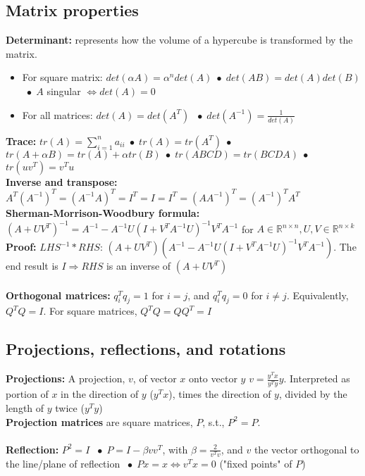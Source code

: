 \documentclass{article}
\newcommand*\bspace{$\; \bullet \;$}
\begin{document}
\subsection{Matrix properties}
\textbf{Determinant: } represents how the volume of a hypercube is transformed by the matrix.
\begin{itemize}
    \item For square matrix: $det(\alpha A) = \alpha^ndet(A)$\bspace$det(AB) = det(A)det(B)$ \bspace $A$ singular $\Leftrightarrow det(A) = 0$
    \item For all matrices: $det(A) = det(A^T)$ \bspace $det(A^{-1}) = \frac{1}{det(A)}$
\end{itemize}
\textbf{Trace:} $tr(A) = \sum_{i = 1}^n a_{ii}$\bspace$tr(A) = tr(A^T)$\bspace$tr(A + \alpha B) = tr(A) + \alpha tr(B)$\bspace$tr(ABCD) = tr(BCDA)$\bspace$tr(uv^T) = v^Tu$\\
\textbf{Inverse and transpose:} $A^T(A^{-1})^T = (A^{-1}A)^T = I^T = I = I^T = (AA^{-1})^T =(A^{-1})^TA^T$\\
\textbf{Sherman-Morrison-Woodbury formula: } $(A+UV^T)^{-1} = A^{-1} - A^{-1}U(I+V^TA^{-1}U)^{-1}V^TA^{-1}$ for $A\in \mathbb{R}^{n\times n}, U,V \in \mathbb{R}^{n\times k}$\\
\textbf{Proof:} $LHS^{-1}*RHS$: $(A+UV^T) (A^{-1} - A^{-1}U(I+V^TA^{-1}U)^{-1}V^TA^{-1})$. The end result is $I \Longrightarrow RHS$ is an inverse of $(A+UV^T)$\\\\
\textbf{Orthogonal matrices:} $q_i^Tq_j = 1$ for $i=j$, and $q_i^Tq_j = 0$ for $i\neq j$. Equivalently, $Q^TQ = I$. For square matrices, $Q^TQ = QQ^T = I$

\subsection{Projections, reflections, and rotations}
\textbf{Projections:} A projection, $v$, of vector $x$ onto vector $y$ $v = \frac{y^Tx}{y^Ty}y$. Interpreted as portion of $x$ in the direction of $y$ ($y^Tx$), times the direction of $y$, divided by the length of $y$ twice ($y^Ty $)\\
\textbf{Projection matrices} are square matrices, $P$, s.t., $P^2 = P$.\\\\
\textbf{Reflection: } $P^2 = I$ \bspace $P = I - \beta vv^T$, with $\beta = \frac{2}{v^Tv}$, and $v$ the vector orthogonal to the line/plane of reflection \bspace $Px = x \Leftrightarrow v^Tx = 0$ ("fixed points" of $P$)
\end{document}

